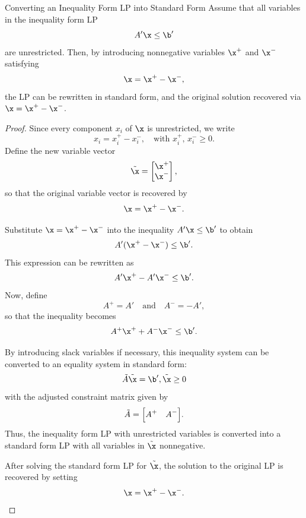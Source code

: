 \begin{proposition}{Converting an Inequality Form LP into Standard Form}{}
Assume that all variables in the inequality form LP
\[
A'\x \le \b'
\]
are unrestricted. Then, by introducing nonnegative variables \(\x^+\) and \(\x^-\) satisfying
\[
\x = \x^+ - \x^-,
\]
the LP can be rewritten in standard form, and the original solution recovered via \(\x = \x^+ - \x^-\).
\end{proposition}

\begin{proof}
Since every component \(x_i\) of \(\x\) is unrestricted, we write
\[
x_i = x_i^+ - x_i^-, \quad \text{with } x_i^+,\, x_i^- \ge 0.
\]
Define the new variable vector
\[
\tilde{\x} = \begin{bmatrix} \x^+ \\ \x^- \end{bmatrix},
\]
so that the original variable vector is recovered by
\[
\x = \x^+ - \x^-.
\]

Substitute \(\x = \x^+ - \x^-\) into the inequality \(A'\x \le \b'\) to obtain
\[
A'(\x^+ - \x^-) \le \b'.
\]
This expression can be rewritten as
\[
A'\x^+ - A'\x^- \le \b'.
\]
Now, define
\[
A^+ = A' \quad \text{and} \quad A^- = -A',
\]
so that the inequality becomes
\[
A^+ \x^+ + A^- \x^- \le \b'.
\]

By introducing slack variables if necessary, this inequality system can be converted to an equality system in standard form:
\[
\tilde{A}\tilde{\x} = \b',\tilde{\x} \geq 0
\]
with the adjusted constraint matrix given by
\[
\tilde{A} = \Bigl[A^+ \quad A^-\Bigr].
\]
Thus, the inequality form LP with unrestricted variables is converted into a standard form LP with all variables in \(\tilde{\x}\) nonnegative.

After solving the standard form LP for \(\tilde{\x}\), the solution to the original LP is recovered by setting
\[
\x = \x^+ - \x^-.
\]
\end{proof}



